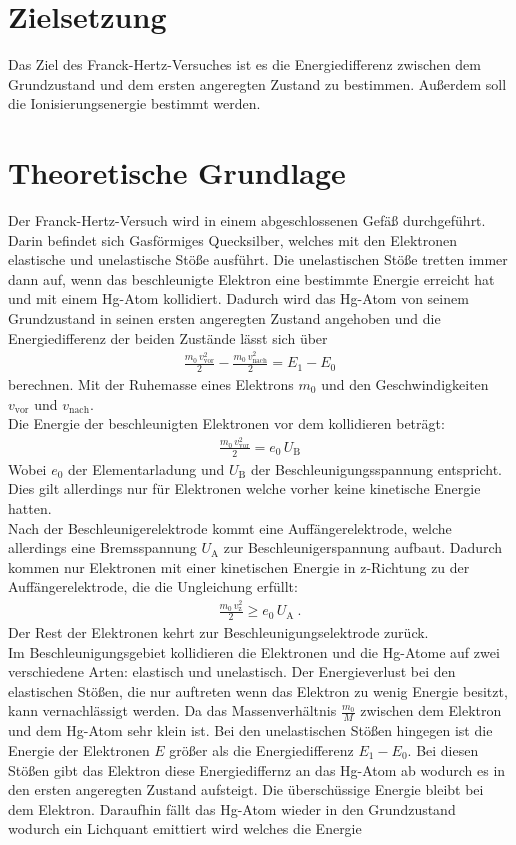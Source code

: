 \section{Zielsetzung}
Das Ziel des Franck-Hertz-Versuches ist es die Energiedifferenz zwischen dem Grundzustand und dem ersten angeregten Zustand zu bestimmen. Außerdem soll die Ionisierungsenergie bestimmt werden.

\section{Theoretische Grundlage}
\label{sec:Theorie}
Der Franck-Hertz-Versuch wird in einem abgeschlossenen Gefäß durchgeführt. Darin befindet sich Gasförmiges Quecksilber, welches mit den Elektronen elastische und unelastische Stöße ausführt. Die unelastischen Stöße tretten immer dann auf, wenn das beschleunigte Elektron eine bestimmte Energie erreicht hat und mit einem Hg-Atom kollidiert. Dadurch wird das Hg-Atom von seinem Grundzustand in seinen ersten angeregten Zustand angehoben und die Energiedifferenz der beiden Zustände lässt sich über
\begin{align}
	\frac{m_0\, v_\text{vor}^2}{2} - \frac{m_0\, v_\text{nach}^2}{2} = E_1 - E_0
\end{align}
berechnen. Mit der Ruhemasse eines Elektrons $m_0$ und den Geschwindigkeiten $v_\text{vor}$ und $v_\text{nach}$. \\
Die Energie der beschleunigten Elektronen vor dem kollidieren beträgt:
\begin{align}
	\frac{m_0\, v_\text{vor}^2}{2} = e_0\, U_\text{B}
\end{align}
Wobei $e_0$ der Elementarladung und $U_\text{B}$ der Beschleunigungsspannung entspricht. Dies gilt allerdings nur für Elektronen welche vorher keine kinetische Energie hatten. \\
Nach der Beschleunigerelektrode kommt eine Auffängerelektrode, welche allerdings eine Bremsspannung $U_\text{A}$ zur Beschleunigerspannung aufbaut. Dadurch kommen nur Elektronen mit einer kinetischen Energie in z-Richtung zu der Auffängerelektrode, die die Ungleichung erfüllt:
\begin{align}
	\frac{m_0\, v_\text{z}^2}{2} \ge e_0\, U_\text{A} \ .
\end{align}
Der Rest der Elektronen kehrt zur Beschleunigungselektrode zurück. \\
Im Beschleunigungsgebiet kollidieren die Elektronen und die Hg-Atome auf zwei verschiedene Arten: elastisch und unelastisch. Der Energieverlust bei den elastischen Stößen, die nur auftreten wenn das Elektron zu wenig Energie besitzt, kann vernachlässigt werden. Da das Massenverhältnis $\frac{m_0}{M}$ zwischen dem Elektron und dem Hg-Atom sehr klein ist. Bei den unelastischen Stößen hingegen ist die Energie der Elektronen $E$ größer als die Energiedifferenz $E_1 - E_0$. Bei diesen Stößen gibt das Elektron diese Energiediffernz an das Hg-Atom ab wodurch es in den ersten angeregten Zustand aufsteigt. Die überschüssige Energie bleibt bei dem Elektron. Daraufhin fällt das Hg-Atom wieder in den Grundzustand wodurch ein Lichquant emittiert wird welches die Energie
